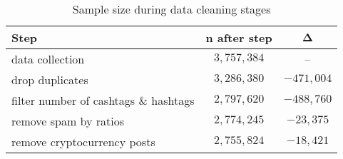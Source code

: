 \begin{table}[!ht]
	\centering
	\begin{tabular}{lcc}
		\toprule
		\textbf{Step} & \textbf{$\bm{n}$ after step} & $\bm{\Delta}$ \\
		\midrule
		data collection & $3,757,384$ & -- \\
		drop duplicates & $3,286,380$ & $-471,004$ \\
		filter number of cashtags \& hashtags & $2,797,620$ & $-488,760$ \\
		remove spam by ratios & $2,774,245$ & $-23,375$ \\
		remove cryptocurrency posts & $2,755,824$ & $-18,421$\\
		\bottomrule
	\end{tabular}
	\caption{Sample size during data cleaning stages}
	\label{table-samplesize-datacleaning}
\end{table}